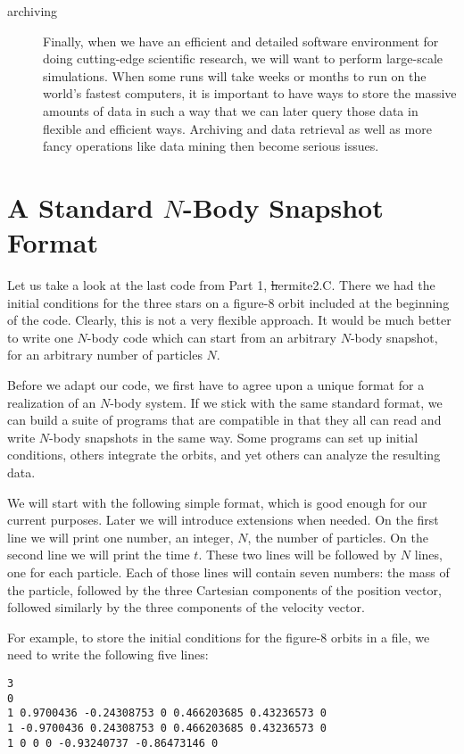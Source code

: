 \begin{description}
\item[archiving]
Finally, when we have an efficient and detailed software environment
for doing cutting-edge scientific research, we will want to perform
large-scale simulations.  When some runs will take weeks or months to
run on the world's fastest computers, it is important to have ways to
store the massive amounts of data in such a way that we can later
query those data in flexible and efficient ways.  Archiving and data
retrieval as well as more fancy operations like data mining then
become serious issues.

\end{description}

\section{A Standard $N$-Body Snapshot Format}

Let us take a look at the last code from Part 1, {\st hermite2.C}.
There we had the initial conditions for the three stars on a figure-8
orbit included at the beginning of the code.  Clearly, this is not a
very flexible approach.  It would be much better to write one $N$-body
code which can start from an arbitrary $N$-body snapshot, for an
arbitrary number of particles $N$.

Before we adapt our code, we first have to agree upon a unique format
for a realization of an $N$-body system.  If we stick with the same
standard format, we can build a suite of programs that are compatible
in that they all can read and write $N$-body snapshots in the same way.
Some programs can set up initial conditions, others integrate the orbits,
and yet others can analyze the resulting data.

We will start with the following simple format, which is good enough
for our current purposes.  Later we will introduce extensions when needed.
On the first line we will print one number, an integer, $N$, the
number of particles.  On the second line we will print the time $t$.
These two lines will be followed by $N$ lines, one for each particle.
Each of those lines will contain seven numbers: the mass of the particle,
followed by the three Cartesian components of the position vector,
followed similarly by the three components of the velocity vector.

For example, to store the initial conditions for the figure-8
orbits in a file, we need to write the following five lines:

\begin{small}
\begin{verbatim}
3
0
1 0.9700436 -0.24308753 0 0.466203685 0.43236573 0
1 -0.9700436 0.24308753 0 0.466203685 0.43236573 0
1 0 0 0 -0.93240737 -0.86473146 0
\end{verbatim}
\end{small}

